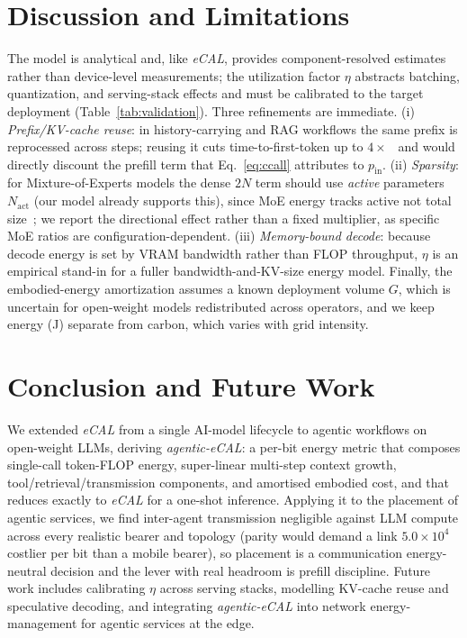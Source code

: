 \documentclass[journal]{IEEEtran}
\newif\ifshowchanges \showchangestrue
\newcommand{\NEW}{\ifshowchanges\color{blue}\fi}
\newcommand{\OLD}{\ifshowchanges\color{black}\fi}
\newcommand{\parityFactor}{\ensuremath{5.0\times10^{4}}}%
\newcommand{\agecal}{\textit{agentic-eCAL}}
\newcommand{\ecal}{\textit{eCAL}}
\begin{document}
\section{Discussion and Limitations}\label{sec:discussion}
The model is analytical and, like \ecal{}, provides component-resolved estimates rather than
device-level measurements; the utilization factor $\eta$ abstracts batching, quantization, and
serving-stack effects and must be calibrated to the target deployment (Table~\ref{tab:validation}).
Three refinements are immediate. (i) \emph{Prefix/KV-cache reuse}: in history-carrying and RAG
workflows the same prefix is reprocessed across steps; reusing it cuts time-to-first-token up to
$4\times$~\cite{ragcache2024} and would directly discount the prefill term that Eq.~\eqref{eq:ccall}
attributes to $p_{\mathrm{in}}$. (ii) \emph{Sparsity}: for Mixture-of-Experts models the dense $2N$
term should use \emph{active} parameters $N_{\mathrm{act}}$ (our model already supports this), since
MoE energy tracks active not total size~\cite{mlenergy_v3}; we report the directional effect rather
than a fixed multiplier, as specific MoE ratios are configuration-dependent. (iii) \emph{Memory-bound
decode}: because decode energy is set by VRAM bandwidth rather than FLOP throughput, $\eta$ is an
empirical stand-in for a fuller bandwidth-and-KV-size energy model. Finally, the embodied-energy
amortization assumes a known deployment volume $G$, which is uncertain for open-weight models
redistributed across operators, and we keep energy (J) separate from carbon, which varies with grid
intensity.

\section{Conclusion and Future Work}\label{sec:conclusion}
We extended \ecal{} from a single AI-model lifecycle to agentic workflows on open-weight LLMs,
deriving \agecal{}: a per-bit energy metric that composes single-call token-FLOP energy, super-linear
multi-step context growth, tool/retrieval/transmission components, and amortised embodied cost, and
that reduces exactly to \ecal{} for a one-shot inference. \NEW Applying it to the placement of
agentic services, we find inter-agent transmission negligible against LLM compute across every
realistic bearer and topology (parity would demand a link \parityFactor{} costlier per bit than a
mobile bearer), so placement is a communication energy-neutral decision and the lever with real headroom is
prefill discipline.\OLD{} Future work includes calibrating $\eta$
across serving stacks, modelling KV-cache reuse and speculative decoding, and integrating \agecal{}
into network energy-management for agentic services at the edge.



\end{document}
